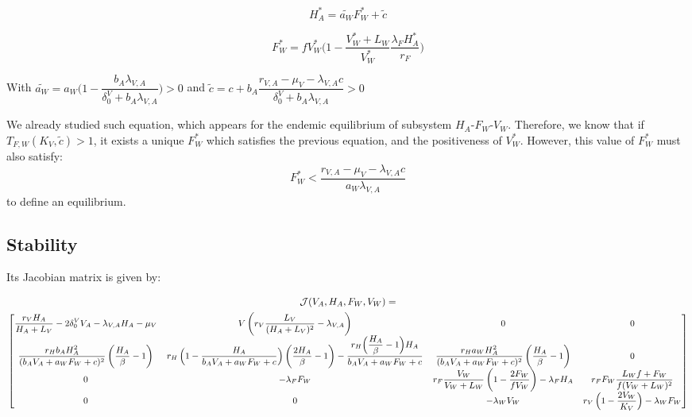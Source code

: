 \documentclass{article}
\newcommand{\lva}{\lambda_{V, A}}
\newcommand{\lfw}{\lambda_{F}}
\newcommand{\lfv}{\lambda_{W}}
\newcommand{\dv}{\delta_0^V}
\begin{document}
\begin{itemize}
\begin{itemize}
\begin{equation*}
H_A^* = \tilde{a_W} F_W^* + \tilde{c}
\end{equation*}

\begin{equation*}
F_W^* = fV_W^* \Big(1 - \dfrac{V_W^* + L_W}{V_W^*}\dfrac{\lfw H_A^*}{r_F} \Big)
\end{equation*}

With $\tilde{a_W} = a_W \Big(1 - \dfrac{b_A \lva}{\dv + b_A \lva} \Big) > 0$ and $\tilde{c} = c+ b_A \dfrac{r_{V,A} - \mu_V - \lva c}{\dv + b_A \lva} > 0$

We already studied such equation, which appears for the endemic equilibrium of subsystem $H_A$-$F_W$-$V_W$. Therefore, we know that if $T_{F,W}(K_V, \tilde{c}) > 1$, it exists a unique $F_W^*$  which satisfies the previous equation, and the positiveness of $V^*_W$. However, this value of $F_W^*$ must also satisfy:
$$
F^*_W < \dfrac{r_{V,A} - \mu_V - \lva c}{a_W \lva}
$$
to define an equilibrium.
\end{itemize}

\end{itemize}


\subsection{Stability}
Its Jacobian matrix is given by:

\begin{landscape}
\begin{multline}
\mathcal{J}(V_A, H_A,F_W,V_W) = \\
{\small
\begin{bmatrix}
\dfrac{r_V H_A}{H_A+L_V}- 2\dv V_A - \lva H_A - \mu_V &  V\left(r_V \dfrac{L_V}{(H_A+L_V)^2} - \lva \right) & 0 & 0\\
\dfrac{r_H b_A H_A^2}{(b_A V_A + a_WF_W + c)^2} \left(\dfrac{H_A}{\beta}-1\right) & r_H \left(1-\dfrac{H_A}{b_A V_A + a_W F_W +c} \right)\left(\dfrac{2H_A}{\beta}-1\right) - \dfrac{r_H \Big(\dfrac{H_A}{\beta}-1\Big)H_A}{b_A V_A + a_WF_W + c} & \dfrac{r_H a_W H_A^2}{(b_A V_A + a_WF_W + c)^2} \left(\dfrac{H_A}{\beta}-1\right) & 0\\
0 & -\lfw F_W & r_F \dfrac{V_W}{V_W + L_W} \left(1 - \dfrac{2F_W}{fV_W}\right) -\lfw H_A  & r_F F_W \dfrac{L_W f + F_W}{f (V_W + L_W)^2} \\
0 & 0 & -\lfv V_W & r_V \left(1 - \dfrac{2V_W}{K_V}\right) - \lfv F_W
\end{bmatrix}}
\end{multline}
\end{landscape}
\end{document}
